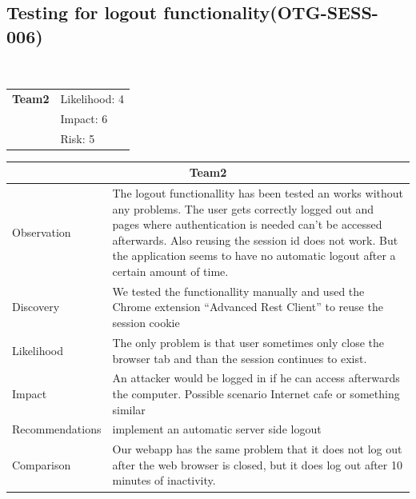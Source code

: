 \documentclass[headsepline,footsepline,footinclude=false,oneside,fontsize=11pt,paper=a4,listof=totoc,bibliography=totoc]{scrbook} %
\begin{document}
\pagebreak
\subsection{Testing for logout functionality(OTG-SESS-006)}\

\begin{tabular}{cR{12cm}}
	\textbf{Team2} & Likelihood: 4\\& Impact: 6\\& Risk: 5
\end{tabular}

\begin{tabular}{ l|p{11cm}  }
	\hline
	\multicolumn{2}{c}{\textbf{Team2}} \\
	\hline
	Observation & The logout functionallity has been tested an works without any problems.
	The user gets correctly logged out and pages where authentication is needed can't be accessed afterwards.
	Also reusing the session id does not work. But the application seems to have no automatic
	logout after a certain amount of time.\\
	Discovery & We tested the functionallity manually and used the Chrome extension ``Advanced Rest Client'' to reuse the session cookie \\
	Likelihood & The only problem is that user sometimes only close the browser tab and than the session continues to exist.\\
	Impact & An attacker would be logged in if he can access afterwards the computer. Possible scenario Internet cafe	or something similar\\
	Recommendations & implement an automatic server side logout\\
	Comparison & Our webapp has the same problem that it does not log out after the web browser is closed, but it does log out after 10 minutes of inactivity.\\
	\hline
\end{tabular}
\\
\vspace{0.5cm}
\\
\end{document}
